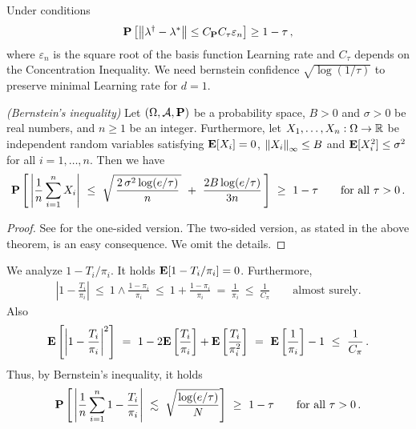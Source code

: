 \begin{theorem}
  Under conditions
  \begin{gather}
    \P
    \left[ 
      \norm{\lambda^\dagger - \lambda^*}
      \le
      C_\P
      C_\tau
      \varepsilon_n
    \right]
    \ge
    1-\tau
    \,,
  \end{gather}
  where 
  $\varepsilon_n$ is the square root of the basis function Learning rate and $C_\tau$ depends on the Concentration Inequality.
  We need bernstein confidence $\sqrt{\log (1/\tau)}$ to preserve minimal Learning rate for $d=1$.
\end{theorem}


\begin{theorem}
  \emph{(Bernstein's inequality)}
  Let
  $
  (\Omega,\mathcal{A},\P)
  $ 
  be a probability space, 
  $
  B>0
  $ 
  and
  $
  \sigma>0
  $
  be real numbers,
  and
  $
  n\ge 1
  $
  be an integer.
  Furthermore, 
  let
  $
  X_1,\ldots,X_n
  :
  \Omega
  \to
  \R
  $
  be independent random variables satisfying
  $
  \E[X_i]=0
  $,
  $
  \norm{X_i}_\infty
  \le
  B
  $
  and
  $
  \E[X_i^2]\le \sigma^2
  $
  for all 
  $
  i=1,\ldots,n
  $.
  Then we have
  \begin{gather*}
   \P
    \left[ 
      \,
      \left| 
      \frac{1}{n}
        \sum_{i=1}^{n} 
        X_i
      \right|
      \ 
      \le
      \ 
      \sqrt{
        \,
        \frac{2\,\sigma^2 \log (e/\tau)}{n}
        \,
      }
      \ 
      +
      \
      \frac{2 B \log(e/\tau)}{3n}
      \,
    \right]
    \ 
    \ge
    \ 
    1-\tau
    \qquad
    \text{for all}\ 
    \tau
    >
    0
    \,.
  \end{gather*}
\end{theorem}
\begin{proof}
  See \cite[Theorem~6.12]{Steinwart2008}
  for the one-sided version. 
  The two-sided version, as stated in the above theorem, is an easy consequence. We omit the details.
\end{proof}

We analyze
$
1-T_i/\pi_i
$.
It holds
$\E[
1-T_i/\pi_i
]=0$.
Furthermore,
\begin{gather}
  \left| 
1
-
\frac{T_i}{\pi_i}
  \right|
  \ 
\le
  \ 
1
\land
\frac{1-\pi_i}{\pi_i}
  \ 
\le
  \ 
1
+
\frac{1-\pi_i}{\pi_i}
  \ 
=
  \ 
\frac{1}{\pi_i}
  \ 
\le
  \ 
\frac{1}{C_\pi}
\qquad
\text{almost surely.}
\end{gather}
Also
\begin{gather}
  \E
  \left[ 
  \left| 
1
-
\frac{T_i}{\pi_i}
  \right|
  ^2
  \right]
\ 
=
\ 
1
-
2
\E
\left[ 
\frac{T_i}{\pi_i}
\right]
+
\E
\left[ 
\frac{T_i}{\pi_i^2}
\right]
\ 
=
\ 
\E
\left[ 
\frac{1}{\pi_i}
\right]
-1
\ 
\le
\ 
\frac{1}{C_\pi}
\,.
\end{gather}
Thus, by Bernstein's inequality, it holds
\begin{gather}
   \P
    \left[ 
      \,
      \left| 
      \frac{1}{n}
        \sum_{i=1}^{n} 
1
-
\frac{T_i}{\pi_i}
      \right|
      \ 
      \lesssim
      \ 
      \sqrt{
        \frac{
        \log (e/\tau)}
      {N}
      }
    \right]
    \ 
    \ge
    \ 
    1-\tau
    \qquad
    \text{for all}\ 
    \tau
    >
    0
    \,.
\end{gather}

